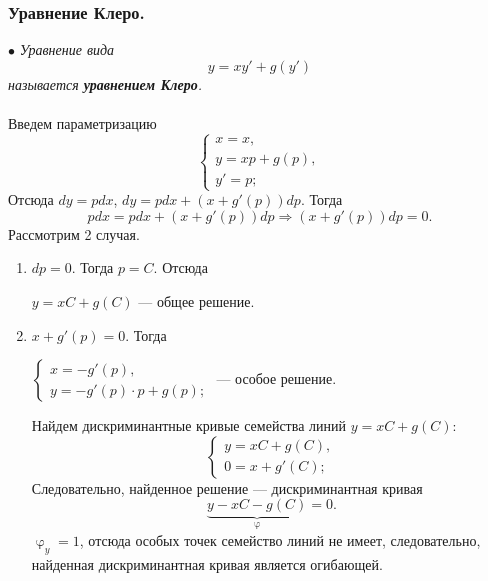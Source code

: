 \documentclass[a4paper, 12pt]{report}
\renewcommand{\varphi}{\upvarphi}
\begin{document}
\subsubsection{Уравнение Клеро.}
$\bullet$ \textit{Уравнение вида $$y = xy' + g(y')$$ называется \textbf{уравнением Клеро}.}\\\\
Введем параметризацию $$\begin{cases}
	x = x,\\
	y = xp + g(p),\\
	y' = p;
\end{cases}$$
Отсюда $dy = pdx$, $dy = pdx + (x + g'(p))dp.$ Тогда $$pdx = pdx + (x + g'(p))dp \Rightarrow (x + g'(p))dp = 0.$$
Рассмотрим 2 случая.\begin{enumerate}
	\item $dp = 0$. Тогда $p = C$. Отсюда \begin{center}
		$y = xC + g(C)$ --- общее решение.
	\end{center}
\item $x + g'(p) = 0.$ Тогда \begin{center}
	$\begin{cases}
		x = -g'(p),\\
		y = -g'(p)\cdot p + g(p);
	\end{cases}$ --- особое решение.
\end{center}
Найдем дискриминантные кривые семейства линий $y = xC + g(C)$:
$$\begin{cases}
	y = xC + g(C),\\
	0 = x + g'(C);
\end{cases}$$
Следовательно, найденное решение --- дискриминантная кривая $$\underbrace{y - xC - g(C)}_{\varphi} = 0.$$
$\varphi_y = 1$, отсюда особых точек семейство линий не имеет, следовательно, найденная дискриминантная кривая является огибающей.
\end{enumerate}
\end{document}
